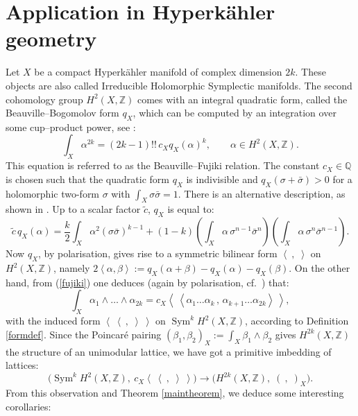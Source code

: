 \documentclass{amsart}
\DeclareMathOperator{\Sym}{Sym}
\newcommand{\coloneqq}{:=}
\newcommand{\bra}{\left<\!\!\!\:\left<}
\newcommand{\ket}{\right>\!\!\!\:\right>}
\newcommand{\Q}{\mathbb{Q}}
\newcommand{\Z}{\mathbb{Z}}
\theoremstyle{plain}
\theoremstyle{definition}
\theoremstyle{remark}
\begin{document}
\section{Application in Hyperk\"ahler geometry}
Let $X$ be a compact Hyperk\"ahler manifold of complex dimension $2k$. These objects are also called Irreducible Holomorphic Symplectic manifolds. The second cohomology group $H^2(X,\Z)$ comes with an integral quadratic form, called the Beauville--Bogomolov form $q_X$, which can be computed by an integration over some cup--product power, see \cite[Subsection~2.3]{OGrady}:
\begin{equation} \label{fujiki}
\int_X \alpha ^{2k} = (2k-1)!!\,c_X q_X(\alpha)^k,\qquad \alpha\in H^2(X,\Z).
\end{equation}
This equation is referred to as the Beauville--Fujiki relation. The constant $c_X\in\Q$ is chosen such that the quadratic form $q_X$ is indivisible and $q_X(\sigma + \bar{\sigma}) > 0$ for a holomorphic two-form $\sigma$ with $\int_X\sigma\bar{\sigma} = 1$. There is an alternative description, as shown in \cite[Chap.~23]{Huybrechts}. Up to a scalar factor $\tilde{c}$, $q_X$ is equal to:
\begin{equation}\label{bb}
 \tilde{c}\,q_X(\alpha) = \frac{k}{2}\int_X \alpha^2 (\sigma\bar{\sigma})^{k-1} + (1-k)\left(\int_X\alpha\,\sigma^{n-1}\bar{\sigma}^{n}\right)\left(\int_X\alpha\,\sigma^{n}\bar{\sigma}^{n-1}\right).
\end{equation}
Now $q_X$, by polarisation, gives rise to a symmetric bilinear form $\left<\ ,\;\right>$ on $H^2(X,\Z)$, namely $2\left<\alpha,\beta\right> \coloneqq q_X(\alpha+\beta)-q_X(\alpha) -q_X(\beta)$. On the other hand, from (\ref{fujiki}) one deduces (again by polarisation, cf.~\cite[Eq.~3.2.4]{OGrady}) that:
\begin{equation}
 \int_X \alpha_1\wedge\ldots\wedge\alpha_{2k} = c_X \bra \alpha_1\ldots\alpha_k\,,\,\alpha_{k+1}\ldots\alpha_{2k}\ket,
\end{equation}
with the induced form $\bra\ ,\;\ket$ on $\Sym^kH^2(X,\Z)$, according to Definition \ref{formdef}. Since the Poincar\'e pairing $(\beta_1,\beta_2)_X \coloneqq \int_X\beta_1\wedge\beta_2$ gives $H^{2k}(X,\Z)$ the structure of an unimodular lattice, we have got a primitive imbedding of lattices:
\begin{equation}
\Big( \Sym^kH^2(X,\Z),\: c_X\!\bra\ ,\;\ket\Big) \longrightarrow \Big(H^{2k}(X,\Z),\;(\ ,\;)_X\Big).
\end{equation}
From this observation and Theorem \ref{maintheorem}, we deduce some interesting corollaries:
\end{document}

